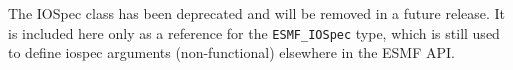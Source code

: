 
The IOSpec class has been deprecated and will be removed in a future 
release.  It is included here only as a reference for the {\tt ESMF\_IOSpec}
type, which is still used to define iospec arguments (non-functional) 
elsewhere in the ESMF API.
